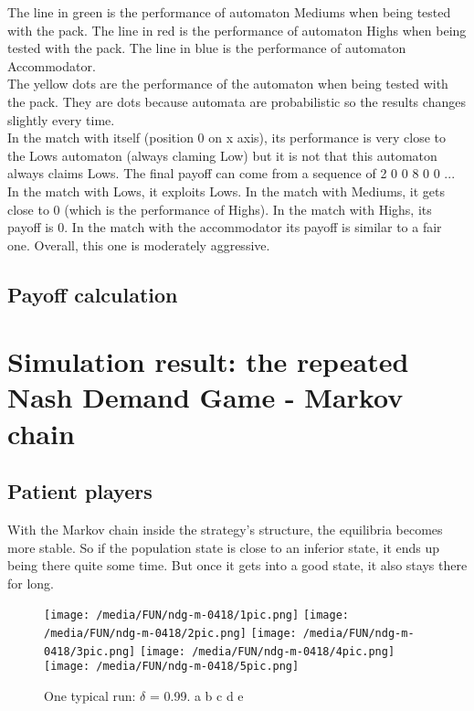 \documentclass[12.5pt]{report}
\begin{document}
The line in green is the performance of automaton Mediums when being tested with the pack. The line in red is the performance of automaton Highs when being tested with the pack. The line in blue is the performance of automaton Accommodator.\\

The yellow dots are the performance of the automaton when being tested with the pack. They are dots because automata are probabilistic so the results changes slightly every time.\\

In the match with itself (position 0 on x axis), its performance is very close to the Lows automaton (always claming Low) but it is not that this automaton always claims Lows. The final payoff can come from a sequence of 2 0 0 8 0 0 ... In the match with Lows, it exploits Lows. In the match with Mediums, it gets close to 0 (which is the performance of Highs). In the match with Highs, its payoff is 0. In the match with the accommodator its payoff is similar to a fair one. Overall, this one is moderately aggressive.\\

\section{Payoff calculation}

\chapter{Simulation result: the repeated Nash Demand Game - Markov chain}

\section{Patient players}

With the Markov chain inside the strategy's structure, the equilibria becomes more stable. So if the population state is close to an inferior state, it ends up being there quite some time. But once it gets into a good state, it also stays there for long.


\begin{figure}
\texttt{[image: /media/FUN/ndg-m-0418/1pic.png]}
\texttt{[image: /media/FUN/ndg-m-0418/2pic.png]}
\texttt{[image: /media/FUN/ndg-m-0418/3pic.png]}
\texttt{[image: /media/FUN/ndg-m-0418/4pic.png]}
\texttt{[image: /media/FUN/ndg-m-0418/5pic.png]}

\caption{One typical run: $\delta$ = 0.99. a b c d e}
\end{figure}
\end{document}
